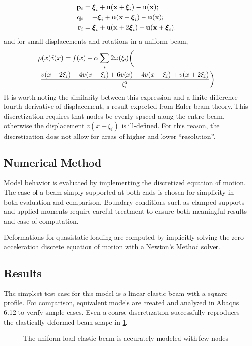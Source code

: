 \documentclass[preprint,review,12pt]{elsarticle}
\newcommand{\plotpath}{./plots}
\begin{document}
\begin{align}
\mathbf{p}_i &= \boldsymbol{\xi}_i+\mathbf{u}(\mathbf{x}+\boldsymbol{\xi}_i)-\mathbf{u}(\mathbf{x});\notag\\
\mathbf{q}_i &= -\boldsymbol{\xi}_i+\mathbf{u}(\mathbf{x}-\boldsymbol{\xi}_i)-\mathbf{u}(\mathbf{x});\notag\\
\mathbf{r}_i &= \boldsymbol{\xi}_i+\mathbf{u}(\mathbf{x}+2\boldsymbol{\xi}_i)-\mathbf{u}(\mathbf{x}+\boldsymbol{\xi}_i).\notag
\end{align}
and for small displacements and rotations in a uniform beam,
\begin{align}
&\rho(x)\ddot{v}(x) = f(x)+\alpha \sum_i 2\omega(\xi_i)\bigg( \notag\\
&\left. \frac{v(x-2\xi_i)-4v(x-\xi_i)+6v(x)-4v(x+\xi_i)+v(x+2\xi_i)}{\xi_i^2}\right) \notag
\end{align}
It is worth noting the similarity between this expression and a finite-difference fourth derivative of displacement, a result expected from Euler beam theory.
This discretization requires that nodes be evenly spaced along the entire beam, otherwise the displacement \(v(x-\xi_i)\) is ill-defined. 
For this reason, the discretization does not allow for areas of higher and lower ``resolution''. 
%
\subsection{Numerical Method}
\label{sec:NumMethod}
Model behavior is evaluated by implementing the discretized equation of motion.
The case of a beam simply supported at both ends is chosen for simplicity in both evaluation and comparison.
Boundary conditions such as clamped supports and applied moments require careful treatment to ensure both meaningful results and ease of computation.

Deformations for quasistatic loading are computed by implicitly solving the zero-acceleration discrete equation of motion with a Newton's Method solver.
%
\subsection{Results}
\label{sec:Results}
The simplest test case for this model is a linear-elastic beam with a square profile.
For comparison, equivalent models are created and analyzed in Abaqus 6.12 to verify simple cases.
Even a coarse discretization successfully reproduces the elastically deformed beam shape in \cref{fig:elastic_g2000}.

\begin{figure}[h]
  \centering
  \resizebox{0.5\linewidth}{!}{}
  \caption{The uniform-load elastic beam is accurately modeled with few nodes}
  \label{fig:elastic_g2000}
\end{figure}
\end{document}
